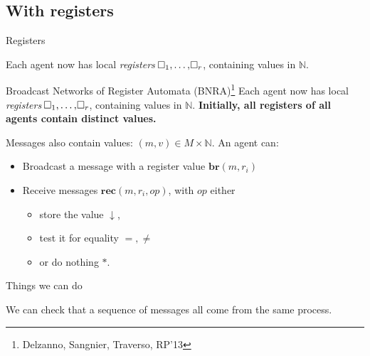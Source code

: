 \documentclass{beamer}
\newcommand{\reg}{\hspace{-0.5mm}\square}
\begin{document}
\subsection{With registers}

\begin{frame}
	\tableofcontents[currentsubsection]
\end{frame}

\begin{frame}{Registers}
	
	Each agent now has local \emph{registers} $\reg_1, \ldots, \reg_r$, containing values in $\mathbb{N}$.\vspace{0.3cm}\pause
	
	
\end{frame}

\begin{frame}{Broadcast Networks of Register Automata (BNRA)\footnote{Delzanno, Sangnier, Traverso, RP'13}}
	Each agent now has local \emph{registers} $\reg_1, \ldots, \reg_r$, containing values in $\mathbb{N}$.
	\pause
	\textbf{Initially, all registers of all agents contain distinct values.}
	
	\pause
	\vspace{0.2cm}
	Messages also contain values: $(m, v) \in M\times \mathbb{N}$.
	An agent can:
	\begin{itemize}
		\item Broadcast a message with a register value $\mathbf{br}(m, r_i)$\vspace{0.3cm}\pause
		
		
		\item Receive messages $\mathbf{rec}(m, r_i, op)$, with $op$ either
		\begin{itemize}
			\item store the value $\downarrow$,
			
			\item test it for equality $=, \neq$
			
			\item or do nothing $*$.
		\end{itemize}   
	\end{itemize}
\end{frame}

\begin{frame}{Things we can do}
	
	We can check that a sequence of messages all come from the same process.
	
	
\end{frame}
\end{document}
